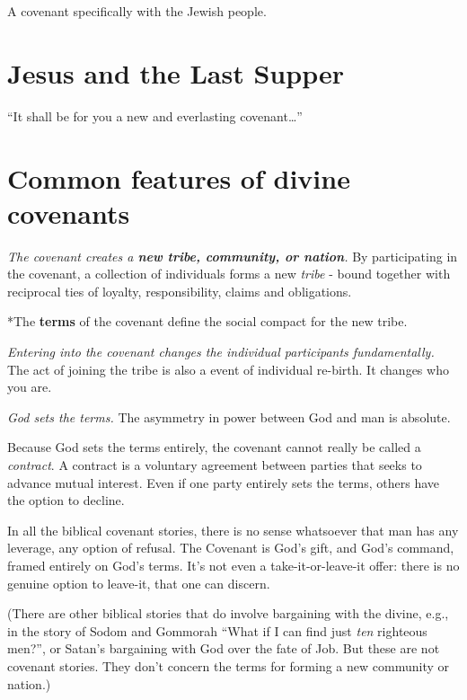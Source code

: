 \documentclass[
]{book}
\begin{document}
A covenant specifically with the Jewish people.

\hypertarget{jesus-and-the-last-supper}{%
\section{Jesus and the Last Supper}\label{jesus-and-the-last-supper}}

``It shall be for you a new and everlasting covenant\ldots{}''

\hypertarget{common-features-of-divine-covenants}{%
\section{Common features of divine covenants}\label{common-features-of-divine-covenants}}

\emph{The covenant creates a \textbf{new tribe, community, or nation}.} By participating in the covenant, a collection of individuals forms a new \emph{tribe} - bound together with reciprocal ties of loyalty, responsibility, claims and obligations.

*The \textbf{terms} of the covenant define the social compact for the new tribe.

\emph{Entering into the covenant changes the individual participants fundamentally.} The act of joining the tribe is also a event of individual re-birth. It changes who you are.

\emph{God sets the terms.} The asymmetry in power between God and man is absolute.

Because God sets the terms entirely, the covenant cannot really be called a \emph{contract}. A contract is a voluntary agreement between parties that seeks to advance mutual interest. Even if one party entirely sets the terms, others have the option to decline.

In all the biblical covenant stories, there is no sense whatsoever that man has any leverage, any option of refusal. The Covenant is God's gift, and God's command, framed entirely on God's terms. It's not even a take-it-or-leave-it offer: there is no genuine option to leave-it, that one can discern.

(There are other biblical stories that do involve bargaining with the divine, e.g., in the story of Sodom and Gommorah ``What if I can find just \emph{ten} righteous men?'', or Satan's bargaining with God over the fate of Job. But these are not covenant stories. They don't concern the terms for forming a new community or nation.)
\end{document}
